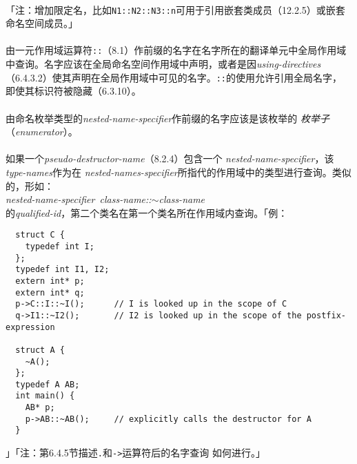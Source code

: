 \paragraph{}
「注：增加限定名，比如\texttt{N1::N2::N3::n}可用于引用嵌套类成员（12.2.5）或嵌套
命名空间成员。」

\paragraph{}
由一元作用域运算符\texttt{::}（8.1）作前缀的名字在名字所在的翻译单元中全局作用域
中查询。名字应该在全局命名空间作用域中声明，或者是因\textit{using-directives}
（6.4.3.2）使其声明在全局作用域中可见的名字。\texttt{::}的使用允许引用全局名字，
即使其标识符被隐藏（6.3.10）。

\paragraph{}
由命名枚举类型的\textit{nested-name-specifier}作前缀的名字应该是该枚举的
\textit{枚举子}（\textit{enumerator}）。

\paragraph{}
如果一个\textit{pseudo-destructor-name}（8.2.4）包含一个
\textit{nested-name-specifier}，该\textit{type-names}作为在
\textit{nested-names-specifier}所指代的作用域中的类型进行查询。类似的，形如： \\
\mbox{\qquad\textit{nested-name-specifier
  class-name::$\sim$class-name}} \\
的\textit{qualified-id}，第二个类名在第一个类名所在作用域内查询。「例：
\begin{lstlisting}
  struct C {
    typedef int I;
  };
  typedef int I1, I2;
  extern int* p;
  extern int* q;
  p->C::I::~I();      // I is looked up in the scope of C
  q->I1::~I2();       // I2 is looked up in the scope of the postfix-expression

  struct A {
    ~A();
  };
  typedef A AB;
  int main() {
    AB* p;
    p->AB::~AB();     // explicitly calls the destructor for A
  }
\end{lstlisting}」「注：第6.4.5节描述\texttt{.}和\texttt{->}运算符后的名字查询
如何进行。」

